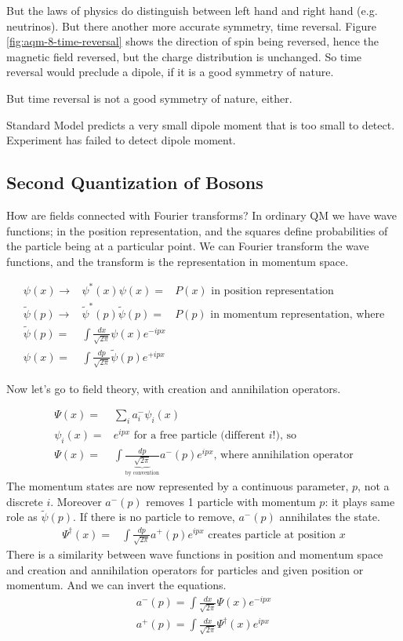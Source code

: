 \documentclass[]{article}
\begin{document}
But the laws of physics do distinguish between left hand and right hand (e.g. neutrinos). But there another more accurate symmetry, time reversal.  Figure \ref{fig:aqm-8-time-reversal} shows the direction of spin being reversed, hence the magnetic field reversed, but the charge distribution is unchanged. So time reversal would preclude a dipole, if it is a good symmetry of nature.

But time reversal is not a good symmetry of nature, either.

Standard Model predicts a very small dipole moment that is too small to detect. Experiment has failed to detect dipole moment.


\subsection{Second Quantization of Bosons}
 How are fields connected with Fourier transforms? In ordinary QM we have wave functions; in the position representation, and the squares define probabilities of the particle being at a particular point. We can Fourier transform the wave functions, and the transform is the representation in momentum space.


\begin{align*}
	\psi(x) \rightarrow& \psi^*(x)\psi(x)=&P(x) \text{ in position representation}\\
	\widetilde{\psi}(p) \rightarrow& \widetilde{\psi}^*(p) \widetilde{\psi}(p) =&P(p) \text{ in momentum representation, where}\\
	\widetilde{\psi}(p) =& \int \frac{dx}{\sqrt{2\pi}} \psi(x) e^{-i p x}\\
	\psi(x) =& \int \frac{dp}{\sqrt{2\pi}} \widetilde{\psi}(p) e^{+i p x}
\end{align*}

Now let's go to field theory, with creation and annihilation operators.

\begin{align*}
	\Psi(x) =& \sum_{i} a^-_i \psi_i(x)\\
	\psi_i(x) =& e^{ipx} \text{ for a free particle (different $i$!), so} \\
	\Psi(x)=& \int \frac{dp}{\underbrace{\sqrt{2\pi}}_\text{by convention}} a^-(p) e^{ipx} \text{, where annihilation operator}
\end{align*}
The momentum states are now represented by a continuous parameter, $p$, not a discrete $i$. Moreover $a^-(p)$  removes 1 particle with momentum $p$: it plays same role as $\widetilde{\psi}(p)$. If there is no particle to remove, $a^-(p)$ annihilates the state.
\begin{align*}
	\Psi^\dagger(x)=& \int \frac{dp}{\sqrt{2\pi}} a^+(p) e^{ipx} \text{ creates particle at position $x$}
\end{align*}
There is a similarity between wave functions in position and momentum space and creation and annihilation operators for particles and given position or momentum. And we can invert the equations.
\begin{align*}
	a^-(p) = \int \frac{dx}{\sqrt{2\pi}} \Psi(x) e^{-ipx}\\
	a^+(p) = \int \frac{dx}{\sqrt{2\pi}} \Psi^\dagger(x) e^{ipx}
\end{align*}
\end{document}
